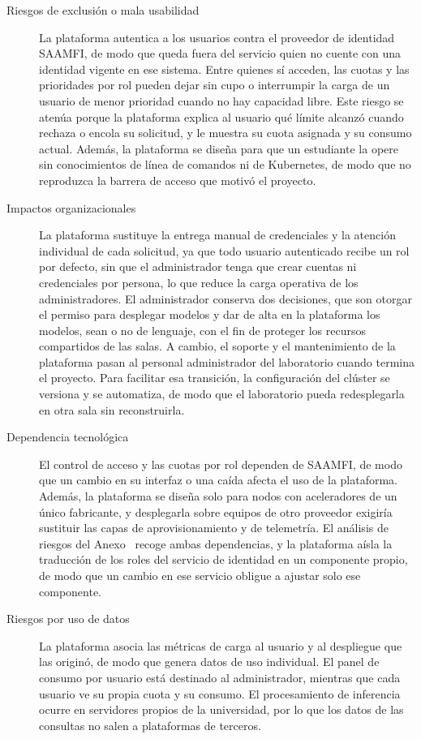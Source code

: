 \begin{description}
  \item[Riesgos de exclusión o mala usabilidad] La plataforma autentica a los usuarios contra el proveedor de identidad SAAMFI, de modo que queda fuera del servicio quien no cuente con una identidad vigente en ese sistema. Entre quienes sí acceden, las cuotas y las prioridades por rol pueden dejar sin cupo o interrumpir la carga de un usuario de menor prioridad cuando no hay capacidad libre. Este riesgo se atenúa porque la plataforma explica al usuario qué límite alcanzó cuando rechaza o encola su solicitud, y le muestra su cuota asignada y su consumo actual. Además, la plataforma se diseña para que un estudiante la opere sin conocimientos de línea de comandos ni de Kubernetes, de modo que no reproduzca la barrera de acceso que motivó el proyecto.
  \item[Impactos organizacionales] La plataforma sustituye la entrega manual de credenciales y la atención individual de cada solicitud, ya que todo usuario autenticado recibe un rol por defecto, sin que el administrador tenga que crear cuentas ni credenciales por persona, lo que reduce la carga operativa de los administradores. El administrador conserva dos decisiones, que son otorgar el permiso para desplegar modelos y dar de alta en la plataforma los modelos, sean o no de lenguaje, con el fin de proteger los recursos compartidos de las salas. A cambio, el soporte y el mantenimiento de la plataforma pasan al personal administrador del laboratorio cuando termina el proyecto. Para facilitar esa transición, la configuración del clúster se versiona y se automatiza, de modo que el laboratorio pueda redesplegarla en otra sala sin reconstruirla.
  \item[Dependencia tecnológica] El control de acceso y las cuotas por rol dependen de SAAMFI, de modo que un cambio en su interfaz o una caída afecta el uso de la plataforma. Además, la plataforma se diseña solo para nodos con aceleradores de un único fabricante, y desplegarla sobre equipos de otro proveedor exigiría sustituir las capas de aprovisionamiento y de telemetría. El análisis de riesgos del Anexo~ recoge ambas dependencias, y la plataforma aísla la traducción de los roles del servicio de identidad en un componente propio, de modo que un cambio en ese servicio obligue a ajustar solo ese componente.
  \item[Riesgos por uso de datos] La plataforma asocia las métricas de carga al usuario y al despliegue que las originó, de modo que genera datos de uso individual. El panel de consumo por usuario está destinado al administrador, mientras que cada usuario ve su propia cuota y su consumo. El procesamiento de inferencia ocurre en servidores propios de la universidad, por lo que los datos de las consultas no salen a plataformas de terceros.

\end{description}
